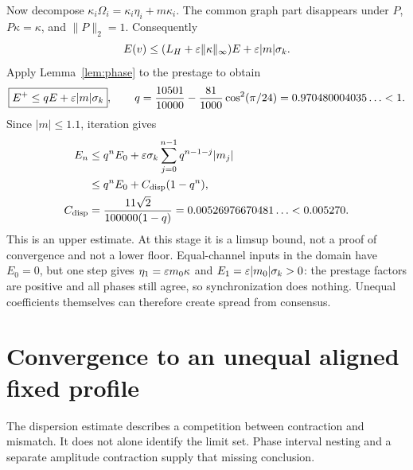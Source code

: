 \documentclass[11pt,a4paper]{article}
\numberwithin{equation}{section}
\theoremstyle{remark}\newtheorem{remark}[theorem]{Remark}
\begin{document}
Now decompose $\kappa_i\Omega_i=\kappa_i\eta_i+m\kappa_i$. The common graph part disappears under $P$, $P\kappa=\kappa$, and $\|P\|_2=1$. Consequently
\begin{equation}
E(v)\le(L_H+\varepsilon\|\kappa\|_\infty)E+\varepsilon|m|\sigma_k.
\end{equation}
Apply Lemma~\ref{lem:phase} to the prestage to obtain
\begin{equation}
\boxed{E^+\le qE+\varepsilon|m|\sigma_k},\qquad
q=\frac{10501}{10000}-\frac{81}{1000}\cos^2(\pi/24)
=0.970480004035\ldots<1.\label{eq:spread}
\end{equation}
Since $|m|\le1.1$, iteration gives
\begin{align}
E_n&\le q^nE_0+\varepsilon\sigma_k\sum_{j=0}^{n-1}q^{n-1-j}|m_j|\notag\\
&\le q^nE_0+C_{\rm disp}(1-q^n),\label{eq:iteratespread}\\
C_{\rm disp}&=\frac{11\sqrt2}{100000(1-q)}
=0.00526976670481\ldots<0.005270.\label{eq:residual}
\end{align}
This is an upper estimate. At this stage it is a limsup bound, not a proof of convergence and not a lower floor. Equal-channel inputs in the domain have $E_0=0$, but one step gives $\eta_1=\varepsilon m_0\kappa$ and $E_1=\varepsilon|m_0|\sigma_k>0$: the prestage factors are positive and all phases still agree, so synchronization does nothing. Unequal coefficients themselves can therefore create spread from consensus.

\section{Convergence to an unequal aligned fixed profile}\label{sec:convergence}

The dispersion estimate describes a competition between contraction and mismatch. It does not alone identify the limit set. Phase interval nesting and a separate amplitude contraction supply that missing conclusion.
\end{document}
